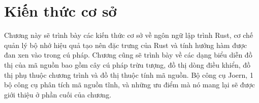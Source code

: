 \chapter{Kiến thức cơ sở}
\label{chap:background}

Chương này sẽ trình bày các kiến thức cơ sở về ngôn ngữ lập trình Rust, cơ chế quản lý bộ nhớ hiệu quả tạo nên đặc trưng của Rust và tính hướng hàm được đan xen vào trong cú pháp.
Chương cũng sẽ trình bày về các dạng biểu diễn đồ thị của mã nguồn bao gồm cây cú pháp trừu tượng, đồ thị dòng điều khiển, đồ thị phụ thuộc chương trình và đồ thị thuộc tính mã nguồn.
Bộ công cụ Joern, 1 bộ công cụ phân tích mã nguồn tĩnh, và những ưu điểm mà nó mang lại sẽ được giới thiệu ở phần cuối của chương.





